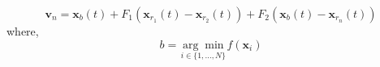 $$\mathbf{v}_{n}=\mathbf{x}_{b}(t)
+F_{1}\left(\mathbf{x}_{r_{1}}(t)-\mathbf{x}_{r_{2}}(t)\right)
+F_{2}\left(\mathbf{x}_{b}(t)-\mathbf{x}_{r_n}(t)\right)$$
where,
$$
b=\underset{i \in\{1, \ldots, N\}}{\arg \min } f\left(\mathbf{x}_{i}\right)
$$